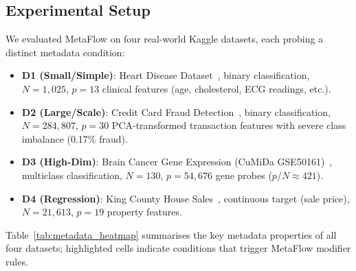 \documentclass[conference]{IEEEtran}
\begin{document}
   \subsection{Experimental Setup}
   We evaluated MetaFlow on four real-world Kaggle datasets, each probing a distinct metadata condition:
   \begin{itemize}
       \item \textbf{D1 (Small/Simple)}: Heart Disease Dataset~\cite{janosi1988heart}, binary classification, $N=1{,}025$, $p=13$ clinical features (age, cholesterol, ECG readings, etc.).
       \item \textbf{D2 (Large/Scale)}: Credit Card Fraud Detection~\cite{dalpozzolo2015fraud}, binary classification, $N=284{,}807$, $p=30$ PCA-transformed transaction features with severe class imbalance (0.17\% fraud).
       \item \textbf{D3 (High-Dim)}: Brain Cancer Gene Expression (CuMiDa GSE50161)~\cite{feltes2019cumida}, multiclass classification, $N=130$, $p=54{,}676$ gene probes ($p/N \approx 421$).
       \item \textbf{D4 (Regression)}: King County House Sales~\cite{harlfoxem2016kc}, continuous target (sale price), $N=21{,}613$, $p=19$ property features.
   \end{itemize}

   Table~\ref{tab:metadata_heatmap} summarises the key metadata properties of all four datasets; highlighted cells indicate conditions that trigger MetaFlow modifier rules.
\end{document}
